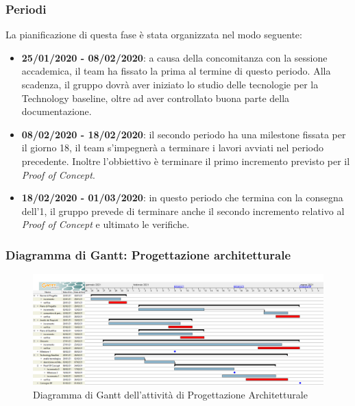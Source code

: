 \subsubsection{Periodi}
La pianificazione di questa fase è stata organizzata nel modo seguente:
\begin{itemize}
\item \textbf{25/01/2020 - 08/02/2020}: a causa della concomitanza con la sessione accademica, il team ha fissato la prima  al termine di questo periodo. Alla scadenza, il gruppo dovrà aver iniziato lo studio delle tecnologie per la Technology baseline, oltre ad aver controllato buona parte della documentazione.

\item \textbf{08/02/2020 - 18/02/2020}: il secondo periodo ha una milestone fissata per il giorno 18, il team s'impegnerà a terminare i lavori avviati nel periodo precedente. Inoltre l'obbiettivo è terminare il primo incremento previsto per il \textit{Proof of Concept}.

\item \textbf{18/02/2020 - 01/03/2020}: in questo periodo che termina con la consegna dell'1, il gruppo prevede di terminare anche il secondo incremento relativo al \textit{Proof of Concept} e ultimato le verifiche.
\end{itemize}

\subsubsection{Diagramma di Gantt: Progettazione architetturale}
\begin{figure}[h]
	\includegraphics[scale=0.30]{Images/GanttPianificazioneProgettazioneArchitetturale.PNG}
	\caption{Diagramma di Gantt dell'attività di Progettazione Architetturale}
\end{figure}